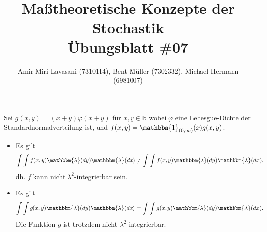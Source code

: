 \documentclass[10pt]{article}
\newenvironment{Aufgabe}[2][Aufgabe]{\begin{trivlist}
\item[\hskip \labelsep {\bfseries #1}\hskip \labelsep {\bfseries #2.}]}{\end{trivlist}}
\begin{document}
 
\title{ \textbf{Maßtheoretische Konzepte der Stochastik \\ -- Übungsblatt \#07 --} }

\author{Amir Miri Lavasani (7310114), Bent Müller (7302332),
        Michael Hermann (6981007)}
\maketitle

\begin{Aufgabe}{1} %
Sei $g(x,y) = (x+y)\varphi(x+y)$ für $x,y \in \mathbb{R}$ wobei $\varphi$ eine Lebesgue-Dichte der Standardnormalverteilung ist, und $f(x,y) = \mathbbm{1}_{(0,\infty)}(x)g(x,y)$.
\begin{itemize}
\item[(i)] Es gilt
$$
\int \int f(x,y) \mathbbm{\lambda}(dy) \mathbbm{\lambda}(dx) \neq \int \int f(x,y) \mathbbm{\lambda}(dy) \mathbbm{\lambda}(dx),
$$
dh. $f$ kann nicht $\lambda^2$-integrierbar sein.
\item[(ii)] Es gilt
$$
\int \int g(x,y) \mathbbm{\lambda}(dy) \mathbbm{\lambda}(dx) = \int \int g(x,y) \mathbbm{\lambda}(dy) \mathbbm{\lambda}(dx).
$$
Die Funktion $g$ ist trotzdem nicht  $\lambda^2$-integrierbar.
\end{itemize}
\end{Aufgabe}
\end{document}
